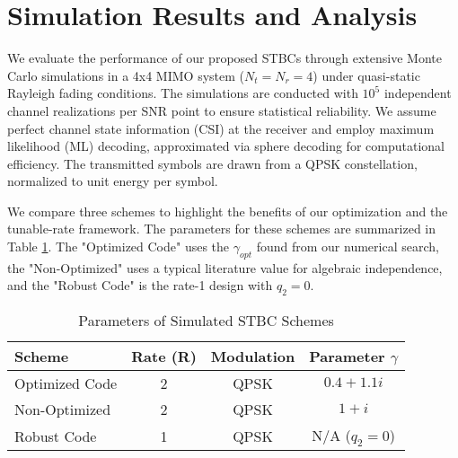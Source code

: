 \section{Simulation Results and Analysis}
We evaluate the performance of our proposed STBCs through extensive Monte Carlo simulations in a 4x4 MIMO system (\(N_t = N_r = 4\)) under quasi-static Rayleigh fading conditions. The simulations are conducted with \(10^5\) independent channel realizations per SNR point to ensure statistical reliability. We assume perfect channel state information (CSI) at the receiver and employ maximum likelihood (ML) decoding, approximated via sphere decoding for computational efficiency. The transmitted symbols are drawn from a QPSK constellation, normalized to unit energy per symbol.

We compare three schemes to highlight the benefits of our optimization and the tunable-rate framework. The parameters for these schemes are summarized in Table \ref{tab:params}. The "Optimized Code" uses the \(\gamma_{opt}\) found from our numerical search, the "Non-Optimized" uses a typical literature value for algebraic independence, and the "Robust Code" is the rate-1 design with \(q_2 = 0\).

\begin{table}[h]
\caption{Parameters of Simulated STBC Schemes}
\label{tab:params}
\centering
\begin{tabular}{|l|c|c|c|}
\hline
\textbf{Scheme} & \textbf{Rate (R)} & \textbf{Modulation} & \textbf{Parameter \(\gamma\)} \\
\hline
Optimized Code & 2 & QPSK & \(0.4 + 1.1i\) \\
Non-Optimized & 2 & QPSK & \(1 + i\) \\
Robust Code & 1 & QPSK & N/A (\(q_2=0\)) \\
\hline
\end{tabular}
\end{table}

